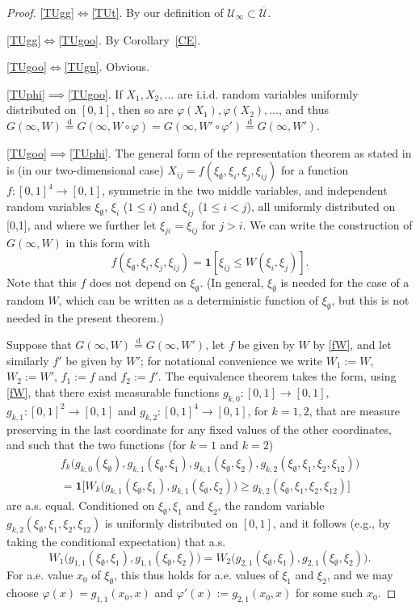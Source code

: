 \documentclass[11pt,reqno,tbtags]{amsart}
\numberwithin{equation}{section}
\theoremstyle{definition}
\theoremstyle{remark}
\newcommand{\refC}[1]{Corollary~\ref{#1}}
\newcommand\bigpar[1]{\bigl(#1\bigr)}
\newcommand\iid{i.i.d.\spacefactor=1000}
\newcommand{\as}{a.s.\spacefactor=1000}
\newcommand{\aex}{a.e.\spacefactor=1000}
\newcommand\eqd{\overset{\mathrm{d}}{=}}
\newcommand\gf{\varphi}
\newcommand\cU{{\mathcal U}}
\newcommand\ett[1]{\boldsymbol1[#1]}
\newcommand\bigett[1]{\boldsymbol1\bigl[#1\bigr]}
\renewcommand{\=}{:=}
\newcommand\oi{[0,1]}
\newcommand{\cuq}{\overline{\cU}}
\newcommand{\cuoo}{\cU_\infty}
\newcommand{\W}[1]{W\circ#1}
\newcommand{\xio}{\xi_\emptyset}
\newcommand{\xii}{\xi_i}
\newcommand{\xij}{\xi_j}
\newcommand{\xiij}{\xi_{ij}}
\newcommand{\uoi}{U(0,1)}
\newcommand{\gko}{g_{k,0}}
\newcommand{\gki}{g_{k,1}}
\newcommand{\gkii}{g_{k,2}}
\newcommand{\gii}{g_{1,1}}
\newcommand{\gji}{g_{2,1}}
\begin{document}
\begin{proof}

\ref{TUgg}$\iff$\ref{TUt}. By our definition of $\cuoo\subset\cuq$.

\ref{TUgg}$\iff$\ref{TUgoo}. By \refC{CE}.

\ref{TUgoo}$\iff$\ref{TUgn}. Obvious.

\ref{TUphi}$\implies$\ref{TUgoo}. If $X_1,X_2,\dots$ are \iid{} random
variables 
uniformly distributed on $\oi$,
then so are $\gf(X_1),\gf(X_2),\dots$, and thus
$G(\infty,W)\eqd G(\infty,\W\gf) = G(\infty,W'\circ\gf')
\eqd G(\infty,W')$.

\ref{TUgoo}$\implies$\ref{TUphi}. 
The general form of the representation theorem as stated in
\cite[Theorem 7.15, see also p.\ 304]{Kallenberg:exch} is (in our
two-dimensional case)
$X_{ij}=f(\xio,\xii,\xij,\xiij)$ for a function $f:\oi^4\to\oi$,
symmetric in the two middle variables, and 
independent random variables 
$\xio$, $\xii$ ($1\le i$) and $\xiij$ ($1\le i<j$), all  
uniformly distributed on \oi, and where we further let 
$\xi_{ji}=\xiij$ for $j>i$.
We can write the construction of $G(\infty,W)$ in this form with
\begin{equation}
  \label{fW}
f(\xio,\xii,\xij,\xiij)=\ett{\xiij\le W(\xii,\xij)}.
\end{equation}
Note that this $f$ does not depend on $\xio$. (In general, $\xio$ is
needed for the case of a random $W$, which can be written as a
deterministic function of $\xio$, but this is not needed in the
present theorem.) 

Suppose that $G(\infty,W)\eqd G(\infty,W')$, let $f$ be given by $W$
by \eqref{fW}, and let similarly $f'$ be given by $W'$; for notational
convenience we write 
$W_1\=W$, $W_2\=W'$, $f_1\=f$ and $f_2\=f'$.
The equivalence theorem \cite[Theorem 7.28]{Kallenberg:exch}
takes the form, using \eqref{fW}, that there exist measurable
functions
$\gko:\oi\to\oi$, $\gki:\oi^2\to\oi$ and $\gkii:\oi^4\to\oi$, for $k=1,2$, 
that are measure preserving in the last coordinate for any fixed
values of the other coordinates, and such that the two functions
(for $k=1$ and $k=2$)
\begin{multline*}
f_k\bigpar{\gko(\xio),\gki(\xio,\xi_1),\gki(\xio,\xi_2),
 \gkii(\xio,\xi_1,\xi_2,\xi_{12})}
\\
=
\bigett{
W_k\bigpar{\gki(\xio,\xi_1),\gki(\xio,\xi_2)} \ge
 \gkii(\xio,\xi_1,\xi_2,\xi_{12})}
\end{multline*}
are \as{} equal.
Conditioned on $\xio,\xi_1$ and $\xi_2$, the random variable 
$ \gkii(\xio,\xi_1,\xi_2,\xi_{12})$ is uniformly distributed on $\oi$,
and it follows (e.g., by taking the conditional expectation) that \as
\begin{equation*}
  W_1\bigpar{\gii(\xio,\xi_1),\gii(\xio,\xi_2)} 
=
W_2\bigpar{\gji(\xio,\xi_1),\gji(\xio,\xi_2)}.
\end{equation*}
For \aex{} value $x_0$ of $\xio$, this thus holds for \aex{} values of $\xi_1$
and $\xi_2$, and we may choose $\gf(x)=\gii(x_0,x)$ and $\gf'(x)\=\gji(x_0,x)$
for some such $x_0$.


\end{proof}
\end{document}
